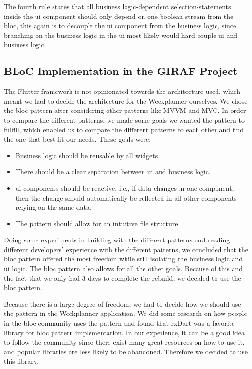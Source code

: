 The fourth rule states that all business logic-dependent selection-statements inside the \gls{ui} component should only depend on one boolean stream from the \gls{bloc}, this again is to decouple the \gls{ui} component from the business logic, since branching on the business logic in the \gls{ui} most likely would hard couple \gls{ui} and business logic.

\subsection{BLoC Implementation in the GIRAF Project}

The Flutter framework is not opinionated towards the architecture used, which meant we had to decide the architecture for the Weekplanner ourselves. We chose the \gls{bloc} pattern after considering other patterns like MVVM and MVC. In order to compare the different patterns, we made some goals we wanted the pattern to fulfill, which enabled us to compare the different patterns to each other and find the one that best fit our needs. These goals were:

\begin{itemize}
  \item Business logic should be reusable by all widgets
  \item There should be a clear separation between \gls{ui} and business logic.
  \item \gls{ui} components should be reactive, i.e., if data changes in one component, then the change should automatically be reflected in all other components relying on the same data.
  \item The pattern should allow for an intuitive file structure.
\end{itemize}

Doing some experiments in building with the different patterns and reading different developers' experience with the different patterns, we concluded that the \gls{bloc} pattern offered the most freedom while still isolating the business logic and \gls{ui} logic. The \gls{bloc} pattern also allows for all the other goals. Because of this and the fact that we only had 3 days to complete the rebuild, we decided to use the \gls{bloc} pattern.

Because there is a large degree of freedom, we had to decide how we should use the pattern in the Weekplanner application. We did some research on how people in the \gls{bloc} community uses the pattern and found that rxDart was a favorite library for \gls{bloc} pattern implementation. In our experience, it can be a good idea to follow the community since there exist many great resources on how to use it, and popular libraries are less likely to be abandoned. Therefore we decided to use this library.

